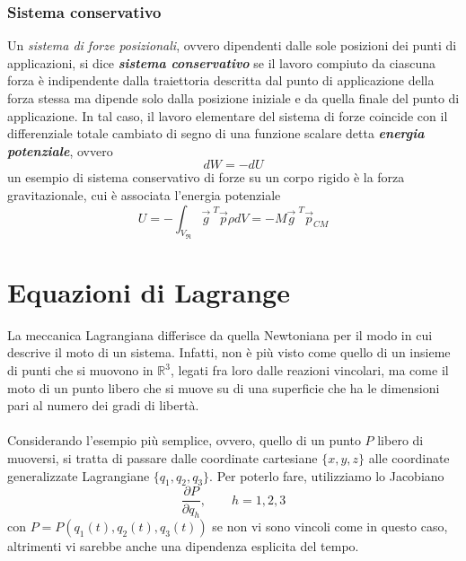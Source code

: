 \subsubsection{Sistema conservativo}
Un \emph{sistema di forze posizionali}, ovvero dipendenti dalle sole posizioni dei punti di applicazioni, si dice \emph{\textbf{sistema conservativo}} se il lavoro compiuto da ciascuna forza è indipendente dalla traiettoria descritta dal punto di applicazione della forza stessa ma dipende solo dalla posizione iniziale e da quella finale del punto di applicazione. In tal caso, il lavoro elementare del sistema di forze coincide con il differenziale totale cambiato di segno di una funzione scalare detta \emph{\textbf{energia potenziale}}, ovvero
\begin{equation}
	dW = -dU
\end{equation}
un esempio di sistema conservativo di forze su un corpo rigido è la forza gravitazionale, cui è associata l'energia potenziale
\begin{equation}
	U = - \int_{V_{\mathfrak{R}}} \vec{g}^{\,\,T} \vec{p} \rho dV = -M \vec{g}^{\,\,T} \vec{p}_{CM}
\end{equation}

\section{Equazioni di Lagrange}
La meccanica Lagrangiana differisce da quella Newtoniana per il modo in cui descrive il moto di un sistema. Infatti, non è più visto come  quello di un insieme di punti che si muovono in $\mathbb{R}^3$, legati fra loro dalle reazioni vincolari, ma come il moto di un punto libero che si muove su di una superficie che ha le dimensioni pari al numero dei gradi di libertà. 

\paragraph{}
Considerando l'esempio più semplice, ovvero, quello di un punto $P$ libero di muoversi, si tratta di passare dalle coordinate cartesiane $\lbrace x, y, z \rbrace$ alle coordinate generalizzate Lagrangiane $\lbrace q_1, q_2, q_3 \rbrace$. Per poterlo fare, utilizziamo lo Jacobiano 
\begin{equation}
	\frac{\partial P}{\partial q_h}, \qquad h = 1,2,3
\end{equation}
con $P = P(q_1(t), q_2(t), q_3(t))$ se non vi sono vincoli come in questo caso, altrimenti vi sarebbe anche una dipendenza esplicita del tempo. 

